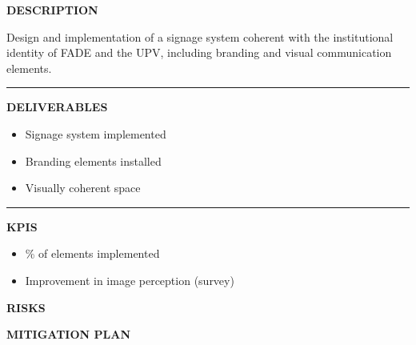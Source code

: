 \documentclass[11pt,a4paper]{scrreprt}
\newcommand{\fieldlabel}[1]{%
  {\footnotesize\sffamily\bfseries\color{mutedcolor}\MakeUppercase{#1}}\par\nopagebreak[4]
}
\newcommand{\fieldsep}{\vspace{3pt}\noindent\textcolor{bordercolor}{\rule{\linewidth}{0.4pt}}\vspace{3pt}\par}
\begin{document}
\begin{tcolorbox}[pabox={espcolor}{A.P.3.1 \enspace\textbullet\enspace Implementation of Identity and Signage}]

\fieldlabel{Description}
{\small Design and implementation of a signage system coherent with the institutional identity of FADE and the UPV, including branding and visual communication elements.}\par
\fieldsep
\fieldlabel{Deliverables}
{\small \begin{itemize}[noitemsep,topsep=2pt]
\item Signage system implemented
\item Branding elements installed
\item Visually coherent space
\end{itemize}}\par
\fieldsep
\fieldlabel{KPIs}
{\small \begin{itemize}[noitemsep,topsep=2pt]
\item \% of elements implemented
\item Improvement in image perception (survey)
\end{itemize}}\par
\end{tcolorbox}
\begin{tcolorbox}[riskbox]
{\footnotesize\sffamily\bfseries\color{red!50!black} RISKS}\par{}
\end{tcolorbox}
\begin{tcolorbox}[mitbox]
{\footnotesize\sffamily\bfseries\color{green!40!black} MITIGATION PLAN}\par{}
\end{tcolorbox}
\vspace{8pt}
\end{document}
